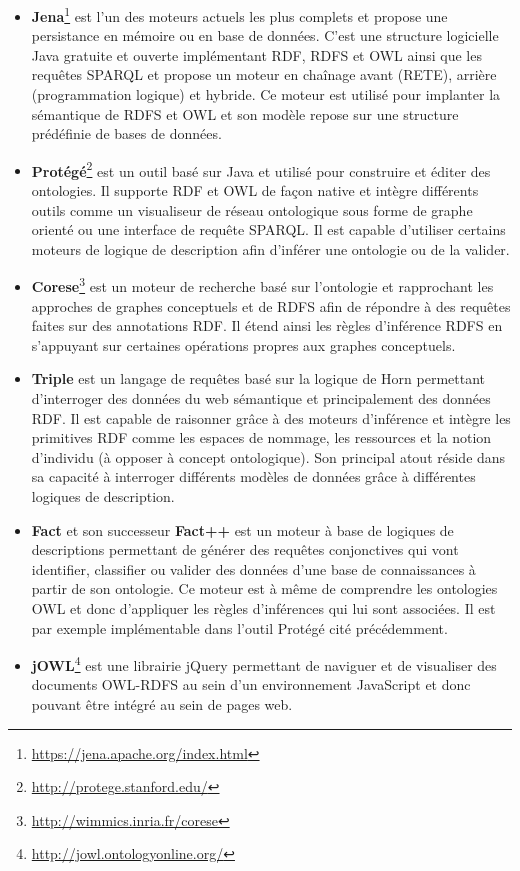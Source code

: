 \begin{itemize}
  \item \textbf{Jena}\footnote{\url{https://jena.apache.org/index.html}} \cite{mcbride2002jena} est l’un des moteurs actuels les plus complets et propose une persistance en mémoire ou en base de données. C'est une structure logicielle Java gratuite et ouverte implémentant RDF, RDFS et OWL ainsi que les requêtes SPARQL et propose un moteur en chaînage avant (RETE), arrière (programmation logique) et hybride. Ce moteur est utilisé pour implanter la sémantique de RDFS et OWL et son modèle repose sur une structure prédéfinie de bases de données.
  \item \textbf{Protégé}\footnote{\url{http://protege.stanford.edu/}} \cite{noy2001creating} est un outil basé sur Java et utilisé pour construire et éditer des ontologies. Il supporte RDF et OWL de façon native et intègre différents outils comme un visualiseur de réseau ontologique sous forme de graphe orienté ou une interface de requête SPARQL. Il est capable d'utiliser certains moteurs de logique de description afin d'inférer une ontologie ou de la valider.
  \item \textbf{Corese}\footnote{\url{http://wimmics.inria.fr/corese}} \cite{corby_searching_2006} est un moteur de recherche basé sur l'ontologie et rapprochant les approches de graphes conceptuels et de RDFS afin de répondre à des requêtes faites sur des annotations RDF. Il étend ainsi les règles d'inférence RDFS en s'appuyant sur certaines opérations propres aux graphes conceptuels.
  \item \textbf{Triple} \cite{sintek2002triple} est un langage de requêtes basé sur la logique de Horn permettant d'interroger des données du web sémantique et principalement des données RDF. Il est capable de raisonner grâce à des moteurs d'inférence et intègre les primitives RDF comme les espaces de nommage, les ressources et la notion d'individu (à opposer à concept ontologique). Son principal atout réside dans sa capacité à interroger différents modèles de données grâce à différentes logiques de description.
  \item \textbf{Fact} et son successeur \textbf{Fact++} \cite{tsarkov2006fact++} est un moteur à base de logiques de descriptions permettant de générer des requêtes conjonctives qui vont identifier, classifier ou valider des données d'une base de connaissances à partir de son ontologie. Ce moteur est à même de comprendre les ontologies OWL et donc d'appliquer les règles d'inférences qui lui sont associées. Il est par exemple implémentable dans l'outil Protégé cité précédemment.
  \item \textbf{jOWL}\footnote{\url{http://jowl.ontologyonline.org/}} est une librairie jQuery permettant de naviguer et de visualiser des documents OWL-RDFS au sein d'un environnement JavaScript et donc pouvant être intégré au sein de pages web.
\end{itemize}


